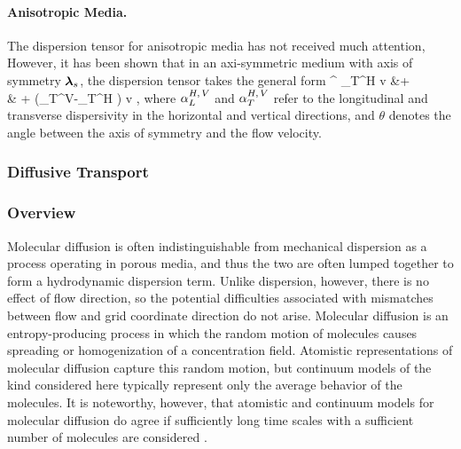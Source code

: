 \paragraph{Anisotropic Media.}

The dispersion tensor for anisotropic media has not received much attention,  However, it has been shown that in an axi-symmetric medium with axis of symmetry $\boldsymbol{\lambda}_s$, the dispersion tensor takes the general form \citep{lichtner_2002}
\BA     \label{gendisp}
\bD^{} \eq \a_T^H v \bI &+   \nonumber\\
& + \left(\a_T^V-\a_T^H \right) v ,
\EA
where ${\alpha}_L^{H,\,V}$ and ${\alpha}_T^{H,\,V}$ refer to the longitudinal and transverse dispersivity in the horizontal and vertical directions, and $\theta$ denotes the angle between the axis of symmetry and the flow velocity.




\subsubsection{Diffusive Transport} 
\label{sec:transport-diffusion}



\subsubsection{Overview}

\noindent Molecular diffusion is often indistinguishable from mechanical dispersion as a process operating in porous media, and thus the two are often lumped together to form a hydrodynamic dispersion term.  Unlike dispersion, however, there is no effect of flow direction, so the potential difficulties associated with mismatches between flow and grid coordinate direction do not arise.  Molecular diffusion is an entropy-producing process in which the random motion of molecules causes spreading or homogenization of a concentration field.  Atomistic representations of molecular diffusion capture this random motion, but continuum models of the kind considered here typically represent only the average behavior of the molecules.  It is noteworthy, however, that atomistic and continuum models for molecular diffusion do agree if sufficiently long time scales with a sufficient number of molecules are considered \citep{bourg2008modeling}.

